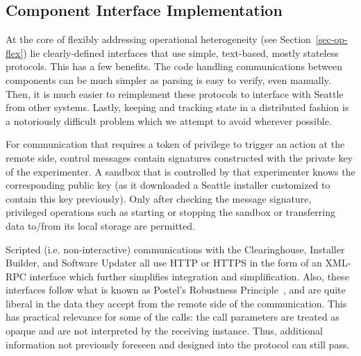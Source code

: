 %



\subsection{Component Interface Implementation}

At the core of flexibly addressing operational heterogeneity (see
Section~\ref{sec-op-flex}) lie clearly-defined interfaces
that use simple, text-based, mostly stateless protocols.
This has a few benefits. The code handling communications between
components can be much simpler as parsing is easy to verify,
even manually. Then, it is much easier to reimplement these protocols
to interface with Seattle from other systems. Lastly, keeping
and tracking state in a distributed fashion is a notoriously
difficult problem which we attempt to avoid wherever possible.

For communication that requires a token of privilege to trigger
an action at the remote side, control messages contain signatures
constructed with the private key of the experimenter. A
sandbox that is controlled by that experimenter knows the
corresponding public key (as it downloaded a Seattle installer
customized to contain this key previously). Only after checking
the message signature, privileged operations such as starting
or stopping the sandbox or transferring data to/from its
local storage are permitted.

Scripted (i.e. non-interactive) communications with the
Clearinghouse, Installer Builder, and Software Updater all
use \gls{HTTP} or \gls{HTTPS} in the form of an
\acrshort{XML}-\acrshort{RPC} interface which further simplifies
integration and simplification. Also, these interfaces
follow what is known as Postel's Robustness
Principle~\cite[\S2.10]{rfc793}, and are quite liberal in the
data they accept from the remote side of the communication.
This has practical relevance for some of the calls:
the call parameters are treated as opaque and are not
interpreted by the receiving instance. Thus, additional
information not previously foreseen and designed into the
protocol can still pass.

